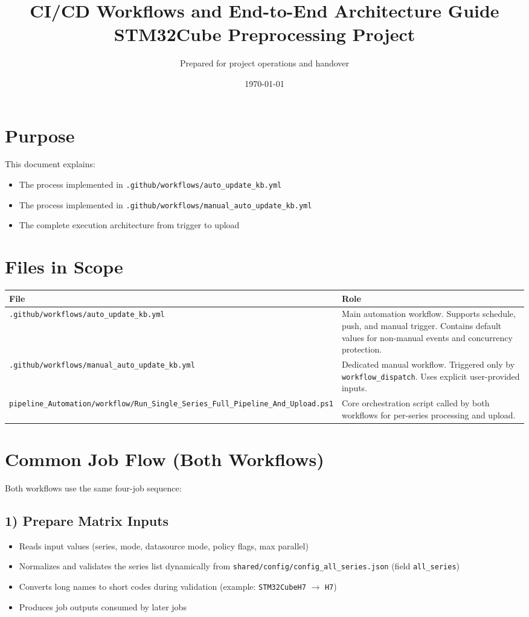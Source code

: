 \documentclass[11pt,a4paper]{article}
\title{CI/CD Workflows and End-to-End Architecture Guide\\STM32Cube Preprocessing Project}
\author{Prepared for project operations and handover}
\date{\today}
\begin{document}
\maketitle
\tableofcontents
\newpage

\section{Purpose}
This document explains:
\begin{itemize}
  \item The process implemented in \texttt{.github/workflows/auto\_update\_kb.yml}
  \item The process implemented in \texttt{.github/workflows/manual\_auto\_update\_kb.yml}
  \item The complete execution architecture from trigger to upload
\end{itemize}

\section{Files in Scope}
\begin{longtable}{|p{}|p{}|}
\hline
\textbf{File} & \textbf{Role} \\
\hline
\texttt{.github/workflows/auto\_update\_kb.yml} & Main automation workflow. Supports schedule, push, and manual trigger. Contains default values for non-manual events and concurrency protection. \\
\hline
\texttt{.github/workflows/manual\_auto\_update\_kb.yml} & Dedicated manual workflow. Triggered only by \texttt{workflow\_dispatch}. Uses explicit user-provided inputs. \\
\hline
\texttt{pipeline\_Automation/workflow/Run\_Single\_Series\_Full\_Pipeline\_And\_Upload.ps1} & Core orchestration script called by both workflows for per-series processing and upload. \\
\hline
\end{longtable}

\section{Common Job Flow (Both Workflows)}
Both workflows use the same four-job sequence:

\subsection{1) Prepare Matrix Inputs}
\begin{itemize}
  \item Reads input values (series, mode, datasource mode, policy flags, max parallel)
  \item Normalizes and validates the series list dynamically from
  \texttt{shared/config/config\_all\_series.json} (field \texttt{all\_series})
  \item Converts long names to short codes during validation
  (example: \texttt{STM32CubeH7} $\rightarrow$ \texttt{H7})
  \item Produces job outputs consumed by later jobs
\end{itemize}
\end{document}

